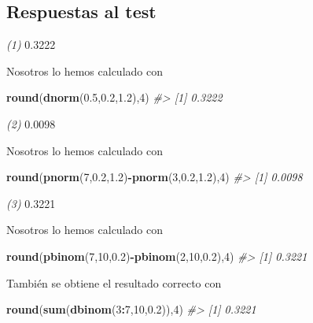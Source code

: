 \documentclass[
]{book}
\newenvironment{Shaded}{\begin{snugshade}}{\end{snugshade}}
\newcommand{\CommentTok}[1]{\textcolor[rgb]{0.56,0.35,0.01}{\textit{#1}}}
\newcommand{\DecValTok}[1]{\textcolor[rgb]{0.00,0.00,0.81}{#1}}
\newcommand{\FloatTok}[1]{\textcolor[rgb]{0.00,0.00,0.81}{#1}}
\newcommand{\KeywordTok}[1]{\textcolor[rgb]{0.13,0.29,0.53}{\textbf{#1}}}
\newcommand{\NormalTok}[1]{#1}
\newcommand{\OperatorTok}[1]{\textcolor[rgb]{0.81,0.36,0.00}{\textbf{#1}}}
\theoremstyle{definition}
\theoremstyle{definition}
\theoremstyle{definition}
\theoremstyle{remark}
\begin{document}
\hypertarget{respuestas-al-test-6}{%
\subsection*{Respuestas al test}\label{respuestas-al-test-6}}

\emph{(1)} 0.3222

Nosotros lo hemos calculado con

\begin{Shaded}
\begin{Highlighting}[]
\KeywordTok{round}\NormalTok{(}\KeywordTok{dnorm}\NormalTok{(}\FloatTok{0.5}\NormalTok{,}\FloatTok{0.2}\NormalTok{,}\FloatTok{1.2}\NormalTok{),}\DecValTok{4}\NormalTok{)}
\CommentTok{\#\textgreater{} [1] 0.3222}
\end{Highlighting}
\end{Shaded}

\emph{(2)} 0.0098

Nosotros lo hemos calculado con

\begin{Shaded}
\begin{Highlighting}[]
\KeywordTok{round}\NormalTok{(}\KeywordTok{pnorm}\NormalTok{(}\DecValTok{7}\NormalTok{,}\FloatTok{0.2}\NormalTok{,}\FloatTok{1.2}\NormalTok{)}\OperatorTok{{-}}\KeywordTok{pnorm}\NormalTok{(}\DecValTok{3}\NormalTok{,}\FloatTok{0.2}\NormalTok{,}\FloatTok{1.2}\NormalTok{),}\DecValTok{4}\NormalTok{)}
\CommentTok{\#\textgreater{} [1] 0.0098}
\end{Highlighting}
\end{Shaded}

\emph{(3)} 0.3221

Nosotros lo hemos calculado con

\begin{Shaded}
\begin{Highlighting}[]
\KeywordTok{round}\NormalTok{(}\KeywordTok{pbinom}\NormalTok{(}\DecValTok{7}\NormalTok{,}\DecValTok{10}\NormalTok{,}\FloatTok{0.2}\NormalTok{)}\OperatorTok{{-}}\KeywordTok{pbinom}\NormalTok{(}\DecValTok{2}\NormalTok{,}\DecValTok{10}\NormalTok{,}\FloatTok{0.2}\NormalTok{),}\DecValTok{4}\NormalTok{)}
\CommentTok{\#\textgreater{} [1] 0.3221}
\end{Highlighting}
\end{Shaded}

También se obtiene el resultado correcto con

\begin{Shaded}
\begin{Highlighting}[]
\KeywordTok{round}\NormalTok{(}\KeywordTok{sum}\NormalTok{(}\KeywordTok{dbinom}\NormalTok{(}\DecValTok{3}\OperatorTok{:}\DecValTok{7}\NormalTok{,}\DecValTok{10}\NormalTok{,}\FloatTok{0.2}\NormalTok{)),}\DecValTok{4}\NormalTok{)}
\CommentTok{\#\textgreater{} [1] 0.3221}
\end{Highlighting}
\end{Shaded}
\end{document}
